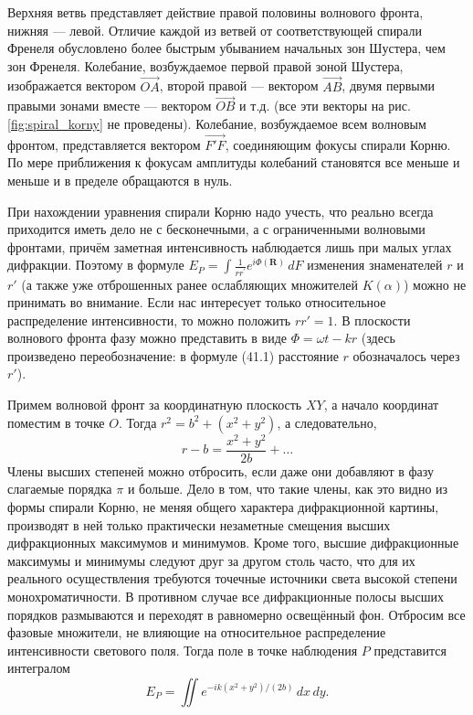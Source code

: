 \documentclass[a4paper,14pt]{article}
\begin{document}
Верхняя ветвь представляет действие правой половины волнового фронта, нижняя — левой. Отличие каждой из ветвей от соответствующей спирали Френеля обусловлено более быстрым убыванием начальных зон Шустера, чем зон Френеля. Колебание, возбуждаемое первой правой зоной Шустера, изображается вектором \( \overrightarrow{OA} \), второй правой — вектором \( \overrightarrow{AB} \), двумя первыми правыми зонами вместе — вектором \( \overrightarrow{OB} \) и т.д. (все эти векторы на рис. \ref{fig:spiral_korny} не проведены). Колебание, возбуждаемое всем волновым фронтом, представляется вектором \( \overrightarrow{F'F} \), соединяющим фокусы спирали Корню. По мере приближения к фокусам амплитуды колебаний становятся все меньше и меньше и в пределе обращаются в нуль.


При нахождении уравнения спирали Корню надо учесть, что реально всегда приходится иметь дело не с бесконечными, а с ограниченными волновыми фронтами, причём заметная интенсивность наблюдается лишь при малых углах дифракции. Поэтому в формуле $E_{P} = \int \frac{1}{r r^{\prime}} e^{i \Phi(\mathbf{R})} \, dF$ изменения знаменателей \( r \) и \( r' \) (а также уже отброшенных ранее ослабляющих множителей \( K(\alpha) \)) можно не принимать во внимание. Если нас интересует только относительное распределение интенсивности, то можно положить \( rr' = 1 \). В плоскости волнового фронта фазу можно представить в виде \( \Phi = \omega t - kr \) (здесь произведено переобозначение: в формуле (41.1) расстояние \( r \) обозначалось через \( r' \)).

Примем волновой фронт за координатную плоскость \( XY \), а начало координат поместим в точке \( O \). Тогда \( r^2 = b^2 + (x^2 + y^2) \), а следовательно, 
\[
r - b = \frac{x^2 + y^2}{2b} + \ldots
\]
Члены высших степеней можно отбросить, если даже они добавляют в фазу слагаемые порядка \( \pi \) и больше. Дело в том, что такие члены, как это видно из формы спирали Корню, не меняя общего характера дифракционной картины, производят в ней только практически незаметные смещения высших дифракционных максимумов и минимумов. Кроме того, высшие дифракционные максимумы и минимумы следуют друг за другом столь часто, что для их реального осуществления требуются точечные источники света высокой степени монохроматичности. В противном случае все дифракционные полосы высших порядков размываются и переходят в равномерно освещённый фон. Отбросим все фазовые множители, не влияющие на относительное распределение интенсивности светового поля. Тогда поле в точке наблюдения \( P \) представится интегралом
\[
E_P = \iint e^{-ik(x^2 + y^2)/(2b)} \, dx \, dy.
\]
\end{document}
